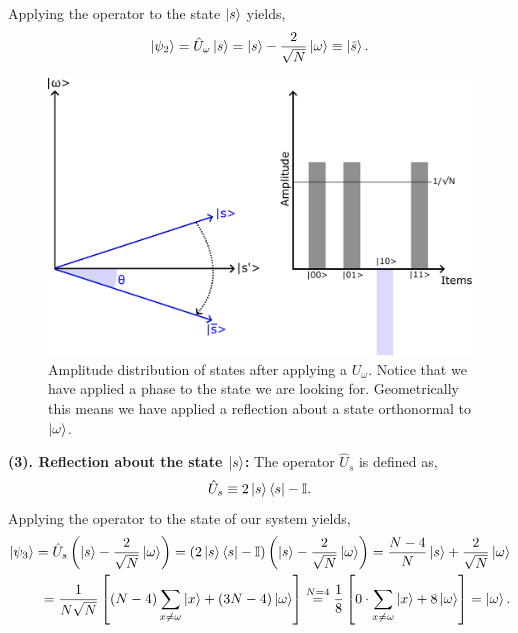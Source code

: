 Applying the operator to the state $\ket{s}$ yields,
\begin{equation}
    \ket{\psi_{2}} = \hat{U}_{\omega}\ket{s} = \ket{s} -\frac{2}{\sqrt{N}}\ket{\omega} \equiv \ket{\bar{s}}.
\end{equation}
\begin{figure}[H]
\centering
    \includegraphics[scale=0.55]{Figures/Grover_Step2.pdf}
    \caption{Amplitude distribution of states after applying a $U_{\omega}$. Notice that we have applied a phase to the state we are looking for. Geometrically this means we have applied a reflection about a state orthonormal to $\ket\omega$.}
    \label{fig:Grover_step2}
\end{figure}
\textbf{(3). Reflection about the state $\ket{s}$:} The operator $\hat{U}_{s}$ is defined as,
\begin{equation}
    \hat{U}_{s} \equiv 2\ket{s}\bra{s} - \mathbb{I}.
\end{equation}
Applying the operator to the state of our system yields,
\begin{align*}
    \ket{\psi_{3}} = \hat{U}_{s}\left(\ket{s} -\frac{2}{\sqrt{N}}\ket{\omega}\right) = \left(2\ket{s}\bra{s} - \mathbb{I}\right)\left(\ket{s} - \frac{2}{\sqrt{N}}\ket{\omega}\right) = \frac{N - 4}{N}\ket{s} + \frac{2}{\sqrt{N}}\ket{\omega} \\
    = \frac{1}{N\sqrt{N}} \left[\left(N - 4\right)\sum_{x\neq \omega}\ket{x} + \left(3N-4\right)\ket{\omega}\right] \overset{N=4}{=} \frac{1}{8} \left[0 \cdot \sum_{x\neq \omega}\ket{x} + 8\ket{\omega}\right] = \ket{\omega}.
\end{align*}
